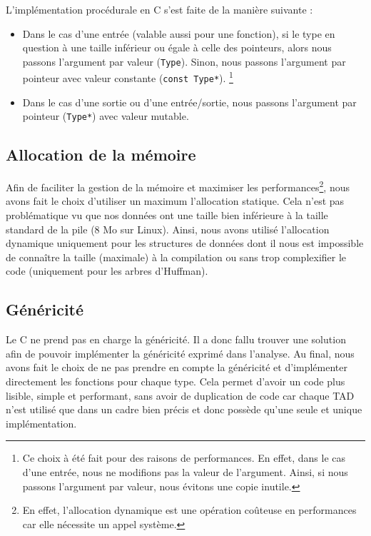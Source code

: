 L'implémentation procédurale en C s'est faite de la manière suivante :

\begin{itemize}
    \item Dans le cas d'une entrée (valable aussi pour une fonction), si le type en question à une taille inférieur ou égale à celle des pointeurs, alors nous passons l'argument par valeur (\texttt{Type}).
    Sinon, nous passons l'argument par pointeur avec valeur constante (\texttt{const Type*}).
    \footnote{Ce choix à été fait pour des raisons de performances. En effet, dans le cas d'une entrée, nous ne modifions pas la valeur de l'argument. Ainsi, si nous passons l'argument par valeur, nous évitons une copie inutile.}
    \item Dans le cas d'une sortie ou d'une entrée/sortie, nous passons l'argument par pointeur (\texttt{Type*}) avec valeur mutable.
\end{itemize}

\subsection{Allocation de la mémoire}

Afin de faciliter la gestion de la mémoire et maximiser les performances\footnote{En effet, l'allocation dynamique est une opération coûteuse en performances car elle nécessite un appel système.},
nous avons fait le choix d'utiliser un maximum l'allocation statique.
Cela n'est pas problématique vu que nos données ont une taille bien inférieure à la taille standard de la pile (8 Mo sur Linux).
Ainsi, nous avons utilisé l'allocation dynamique uniquement pour les structures de données dont il nous est impossible de connaître la taille (maximale) à la compilation ou sans trop complexifier le code
(uniquement pour les arbres d'Huffman).

\subsection{Généricité}

Le C ne prend pas en charge la généricité. Il a donc fallu trouver une solution afin de pouvoir implémenter la généricité exprimé dans l'analyse.
Au final, nous avons fait le choix de ne pas prendre en compte la généricité et d'implémenter directement les fonctions pour chaque type.
Cela permet d'avoir un code plus lisible, simple et performant, sans avoir de duplication de code car chaque TAD n'est utilisé que dans un cadre bien précis et donc possède qu'une seule et unique implémentation.
